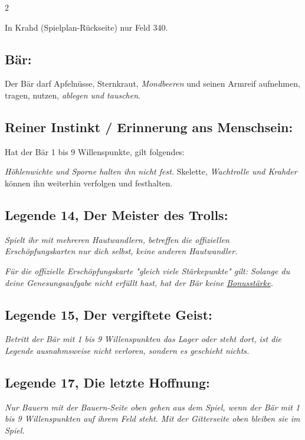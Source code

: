 \documentclass[10pt, a4paper, oneside]{book}
\newcommand{\fan}[1]{\textit{#1}}
\begin{document}
\begin{multicols*}{2}
\begin{bgcolor}
\bullet{} In Krahd (Spielplan-Rückseite) nur Feld 340.
\supercite{DH:Begleitheft}




\subsection{Bär:}

Der Bär darf Apfelnüsse, Sternkraut, \fan{Mondbeeren} und seinen Armreif aufnehmen, tragen, nutzen, \fan{ablegen und tauschen}.
\supercite{DH:Bär}

\subsection{Reiner Instinkt / Erinnerung ans Menschsein:}

Hat der Bär 1 bis 9 Willenspunkte, gilt folgendes:

\bullet{} \fan{Höhlenwichte und Sporne halten ihn nicht fest.} Skelette, \fan{Wachtrolle und Krahder} können ihn weiterhin verfolgen und festhalten.
\supercite{46529}


\subsection{Legende 14, Der Meister des Trolls:}

\fan{Spielt ihr mit mehreren Hautwandlern, betreffen die offiziellen Erschöpfungskarten nur dich selbst, keine anderen Hautwandler.}

\fan{Für die offizielle Erschöpfungskarte "gleich viele Stärkepunkte" gilt: Solange du deine Genesungsaufgabe nicht erfüllt hast, hat der Bär keine \hyperref[Bonusstärke]{Bonusstärke}.}


\subsection{Legende 15, Der vergiftete Geist:}

\fan{Betritt der Bär mit 1 bis 9 Willenspunkten das Lager oder steht dort, ist die Legende ausnahmsweise nicht verloren, sondern es geschieht nichts.}


\subsection{Legende 17, Die letzte Hoffnung:}

\fan{Nur Bauern mit der Bauern-Seite oben gehen aus dem Spiel, wenn der Bär mit 1 bis 9 Willenspunkten auf ihrem Feld steht. Mit der Gitterseite oben bleiben sie im Spiel.}


\end{bgcolor}
\end{multicols*}
\end{document}
